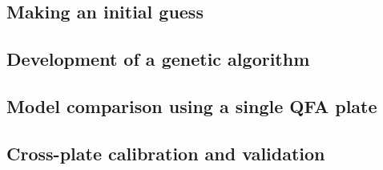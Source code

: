 
\subsection{\thesubsection~Making an initial guess}
\label{sec:initial_guess}


\subsection{\thesubsection~Development of a genetic algorithm}
\subsection{\thesubsection~Model comparison using a single QFA plate}
\subsection{\thesubsection~Cross-plate calibration and validation}
